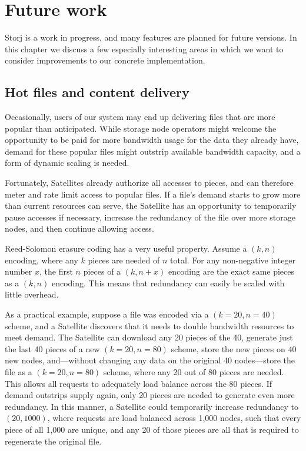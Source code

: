\documentclass[8pt,fleqn,openany]{book}
\begin{document}
\chapter{Future work}\label{chap:future-work}

Storj is a work in progress, and many features are planned for future
versions. In this chapter we discuss a few especially interesting areas in
which we want to consider improvements to our concrete implementation.

\section{Hot files and content delivery}\label{sec:future-hot-files}

Occasionally, users of our system may end up delivering files that are more
popular than anticipated. While storage node operators might welcome the
opportunity to be paid for more bandwidth usage for the data they already have,
demand for these popular files might outstrip available bandwidth capacity,
and a form of dynamic scaling is needed.

Fortunately, Satellites already authorize all accesses to pieces, and
can therefore meter and rate limit access to popular
files. If a file's demand starts to grow more than current resources can serve,
the Satellite has an opportunity to temporarily pause accesses if necessary,
increase the redundancy of the file over more storage nodes, and then continue
allowing access.

Reed-Solomon erasure coding has a very useful property. Assume a $(k, n)$
encoding, where any $k$ pieces are needed of $n$ total. For any non-negative
integer number $x$, the first $n$ pieces of a $(k, n+x)$ encoding are the exact
same pieces as a $(k, n)$ encoding. This means that redundancy can easily be
scaled with little overhead.

As a practical example, suppose a file was encoded via a $(k=20, n=40)$ scheme,
and a Satellite discovers that it needs to double bandwidth resources to meet demand.
The Satellite can download any 20 pieces of the 40, generate just the last 40
pieces of a new $(k=20, n=80)$ scheme, store the new pieces on 40 new nodes,
and---without changing any data on the original 40 nodes---store the file
as a $(k=20, n=80)$ scheme, where any 20 out of 80 pieces are needed.
This allows all requests to adequately load balance across the 80 pieces.
If demand outstrips supply again, only 20 pieces are needed to generate even
more redundancy. In this manner, a Satellite could temporarily increase
redundancy to $(20, 1000)$, where requests are load balanced across 1,000 nodes,
such that every piece of all 1,000 are unique, and any 20 of those pieces are
all that is required to regenerate the original file.
\end{document}
